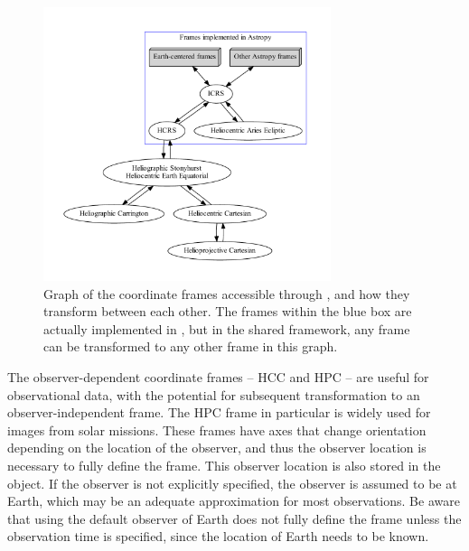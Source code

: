 \begin{figure}
    \centering
    \includegraphics[width=0.75\textwidth]{figures/sunpy_frames.pdf}
    \caption{Graph of the coordinate frames accessible through , and how they transform between each other.
    The frames within the blue box are actually implemented in , but in the shared framework, any frame can be transformed to any other frame in this graph.}
    \label{fig:transform_graph}
\end{figure}

The observer-dependent coordinate frames -- HCC and HPC -- are useful for observational data, with the potential for subsequent transformation to an observer-independent frame.
The HPC frame in particular is widely used for images from solar missions.
These frames have axes that change orientation depending on the location of the observer, and thus the observer location is necessary to fully define the frame.
This observer location is also stored in the  object.
If the observer is not explicitly specified, the observer is assumed to be at Earth, which may be an adequate approximation for most observations.
Be aware that using the default observer of Earth does not fully define the frame unless the observation time is specified, since the location of Earth needs to be known.

